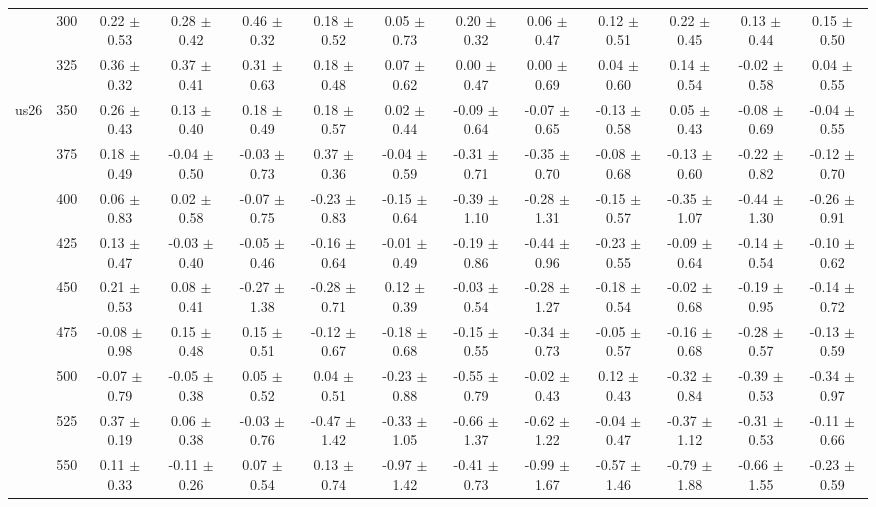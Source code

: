 \begin{table}[h]
{\begin{tabular}{
        ccccccccccccc}
 & 300& 0.22 $\pm$ 0.53& 0.28 $\pm$ 0.42& 0.46 $\pm$ 0.32& 0.18 $\pm$ 0.52& 0.05 $\pm$ 0.73& 0.20 $\pm$ 0.32& 0.06 $\pm$ 0.47& 0.12 $\pm$ 0.51& 0.22 $\pm$ 0.45& 0.13 $\pm$ 0.44& 0.15 $\pm$ 0.50 \\ 
 & 325& 0.36 $\pm$ 0.32& 0.37 $\pm$ 0.41& 0.31 $\pm$ 0.63& 0.18 $\pm$ 0.48& 0.07 $\pm$ 0.62& 0.00 $\pm$ 0.47& 0.00 $\pm$ 0.69& 0.04 $\pm$ 0.60& 0.14 $\pm$ 0.54& -0.02 $\pm$ 0.58& 0.04 $\pm$ 0.55 \\ 
\multirow{4}{*}{us26}& 350& 0.26 $\pm$ 0.43& 0.13 $\pm$ 0.40& 0.18 $\pm$ 0.49& 0.18 $\pm$ 0.57& 0.02 $\pm$ 0.44& -0.09 $\pm$ 0.64& -0.07 $\pm$ 0.65& -0.13 $\pm$ 0.58& 0.05 $\pm$ 0.43& -0.08 $\pm$ 0.69& -0.04 $\pm$ 0.55 \\ 
 & 375& 0.18 $\pm$ 0.49& -0.04 $\pm$ 0.50& -0.03 $\pm$ 0.73& 0.37 $\pm$ 0.36& -0.04 $\pm$ 0.59& -0.31 $\pm$ 0.71& -0.35 $\pm$ 0.70& -0.08 $\pm$ 0.68& -0.13 $\pm$ 0.60& -0.22 $\pm$ 0.82& -0.12 $\pm$ 0.70 \\ 
 & 400& 0.06 $\pm$ 0.83& 0.02 $\pm$ 0.58& -0.07 $\pm$ 0.75& -0.23 $\pm$ 0.83& -0.15 $\pm$ 0.64& -0.39 $\pm$ 1.10& -0.28 $\pm$ 1.31& -0.15 $\pm$ 0.57& -0.35 $\pm$ 1.07& -0.44 $\pm$ 1.30& -0.26 $\pm$ 0.91 \\ 
 & 425& 0.13 $\pm$ 0.47& -0.03 $\pm$ 0.40& -0.05 $\pm$ 0.46& -0.16 $\pm$ 0.64& -0.01 $\pm$ 0.49& -0.19 $\pm$ 0.86& -0.44 $\pm$ 0.96& -0.23 $\pm$ 0.55& -0.09 $\pm$ 0.64& -0.14 $\pm$ 0.54& -0.10 $\pm$ 0.62 \\ 
 & 450& 0.21 $\pm$ 0.53& 0.08 $\pm$ 0.41& -0.27 $\pm$ 1.38& -0.28 $\pm$ 0.71& 0.12 $\pm$ 0.39& -0.03 $\pm$ 0.54& -0.28 $\pm$ 1.27& -0.18 $\pm$ 0.54& -0.02 $\pm$ 0.68& -0.19 $\pm$ 0.95& -0.14 $\pm$ 0.72 \\ 
 & 475& -0.08 $\pm$ 0.98& 0.15 $\pm$ 0.48& 0.15 $\pm$ 0.51& -0.12 $\pm$ 0.67& -0.18 $\pm$ 0.68& -0.15 $\pm$ 0.55& -0.34 $\pm$ 0.73& -0.05 $\pm$ 0.57& -0.16 $\pm$ 0.68& -0.28 $\pm$ 0.57& -0.13 $\pm$ 0.59 \\ 
 & 500& -0.07 $\pm$ 0.79& -0.05 $\pm$ 0.38& 0.05 $\pm$ 0.52& 0.04 $\pm$ 0.51& -0.23 $\pm$ 0.88& -0.55 $\pm$ 0.79& -0.02 $\pm$ 0.43& 0.12 $\pm$ 0.43& -0.32 $\pm$ 0.84& -0.39 $\pm$ 0.53& -0.34 $\pm$ 0.97 \\ 
 & 525& 0.37 $\pm$ 0.19& 0.06 $\pm$ 0.38& -0.03 $\pm$ 0.76& -0.47 $\pm$ 1.42& -0.33 $\pm$ 1.05& -0.66 $\pm$ 1.37& -0.62 $\pm$ 1.22& -0.04 $\pm$ 0.47& -0.37 $\pm$ 1.12& -0.31 $\pm$ 0.53& -0.11 $\pm$ 0.66 \\ 
 & 550& 0.11 $\pm$ 0.33& -0.11 $\pm$ 0.26& 0.07 $\pm$ 0.54& 0.13 $\pm$ 0.74& -0.97 $\pm$ 1.42& -0.41 $\pm$ 0.73& -0.99 $\pm$ 1.67& -0.57 $\pm$ 1.46& -0.79 $\pm$ 1.88& -0.66 $\pm$ 1.55& -0.23 $\pm$ 0.59 \\ 

\end{tabular}}
\end{table}
